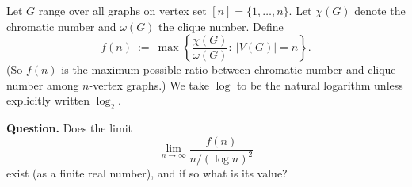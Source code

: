 Let $G$ range over all graphs on vertex set $[n]=\{1,\dots,n\}$.  Let $\chi(G)$ denote the chromatic number and $\omega(G)$ the clique number.  Define
\[
f(n)\ :=\ \max\left\{ \frac{\chi(G)}{\omega(G)}:\ |V(G)|=n\right\}.
\]
(So $f(n)$ is the maximum possible ratio between chromatic number and clique number among $n$-vertex graphs.)
We take $\log$ to be the natural logarithm unless explicitly written $\log_2$.

\medskip
\noindent\textbf{Question.} Does the limit
\[
\lim_{n\to\infty}\frac{f(n)}{n/(\log n)^2}
\]
exist (as a finite real number), and if so what is its value?
